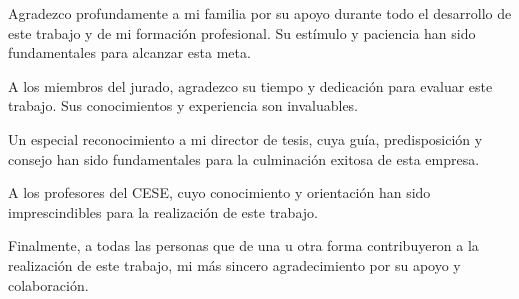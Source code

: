 \documentclass[
    11pt,
    spanish,
    singlespacing,
    parskip,
    headsepline,
    bookmarks=true,
    unicode=true,
    pdftoolbar=true,
    pdfmenubar=true,
    pdffitwindow=false,
    colorlinks=true,
    linkcolor=blue,
    citecolor=blue,
    urlcolor=blue
]{MastersDoctoralThesis}
\begin{document}



\frontmatter %
\pagestyle{plain} %


\begin{abstract}
\addchaptertocentry{\abstractname} %
Este trabajo presenta el desarrollo, construcción, instalación y prueba de un dispositivo semiautomático de monitoreo y gestión para un cultivo hidropónico vertical.
El sistema mejora la eficiencia del cultivo al minimizar los desperdicios y aumentar la productividad en comparación con los métodos tradicionales. Este avance representa un paso clave hacia la sostenibilidad y la optimización de la producción de alimentos en el futuro.
Su implementación requirió la aplicación de conocimientos en electrónica, programación, sistemas operativos de tiempo real, testing de software, diseño y ensamblaje de PCB, integración de sensores y protocolos de comunicación.

\end{abstract}


\begin{acknowledgements}
\vspace{1.5cm}

Agradezco profundamente a mi familia por su apoyo durante todo el desarrollo de este trabajo y de mi formación profesional. Su estímulo y paciencia han sido fundamentales para alcanzar esta meta.

A los miembros del jurado, agradezco su tiempo y dedicación para evaluar este trabajo. Sus conocimientos y experiencia son invaluables.

Un especial reconocimiento a mi director de tesis, cuya guía, predisposición y consejo han sido fundamentales para la culminación exitosa de esta empresa.

A los profesores del CESE, cuyo conocimiento y orientación han sido imprescindibles para la realización de este trabajo.

Finalmente, a todas las personas que de una u otra forma contribuyeron a la realización de este trabajo, mi más sincero agradecimiento por su apoyo y colaboración.

\end{acknowledgements}
\end{document}
